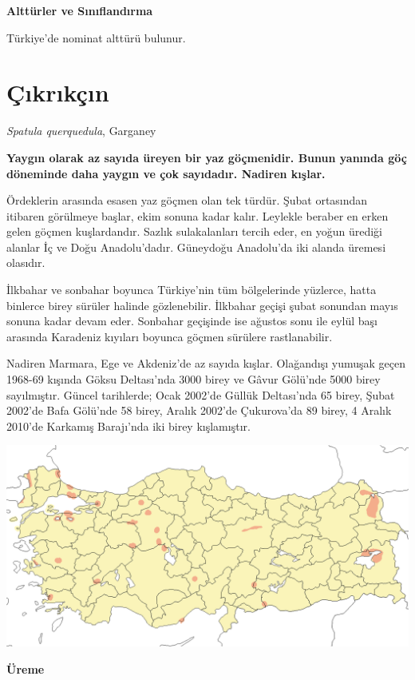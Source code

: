 \documentclass[
  a4paper,
  DIV=11,
  numbers=noendperiod]{scrartcl}
\begin{document}
\textbf{Alttürler ve Sınıflandırma}

Türkiye'de nominat alttürü bulunur.

\section{Çıkrıkçın}\label{uxe7ux131krux131kuxe7ux131n}

\emph{Spatula querquedula}, Garganey

\textbf{Yaygın olarak az sayıda üreyen bir yaz göçmenidir. Bunun yanında
göç döneminde daha yaygın ve çok sayıdadır. Nadiren kışlar.}

Ördeklerin arasında esasen yaz göçmen olan tek türdür. Şubat ortasından
itibaren görülmeye başlar, ekim sonuna kadar kalır. Leylekle beraber en
erken gelen göçmen kuşlardandır. Sazlık sulakalanları tercih eder, en
yoğun ürediği alanlar İç ve Doğu Anadolu'dadır. Güneydoğu Anadolu'da iki
alanda üremesi olasıdır.

İlkbahar ve sonbahar boyunca Türkiye'nin tüm bölgelerinde yüzlerce,
hatta binlerce birey sürüler halinde gözlenebilir. İlkbahar geçişi şubat
sonundan mayıs sonuna kadar devam eder. Sonbahar geçişinde ise ağustos
sonu ile eylül başı arasında Karadeniz kıyıları boyunca göçmen sürülere
rastlanabilir.

Nadiren Marmara, Ege ve Akdeniz'de az sayıda kışlar. Olağandışı yumuşak
geçen 1968-69 kışında Göksu Deltası'nda 3000 birey ve Gâvur Gölü'nde
5000 birey sayılmıştır. Güncel tarihlerde; Ocak 2002'de Güllük
Deltası'nda 65 birey, Şubat 2002'de Bafa Gölü'nde 58 birey, Aralık
2002'de Çukurova'da 89 birey, 4 Aralık 2010'de Karkamış Barajı'nda iki
birey kışlamıştır.

\includegraphics{images/harita_Spatula querquedula.png}

\textbf{Üreme}
\end{document}
